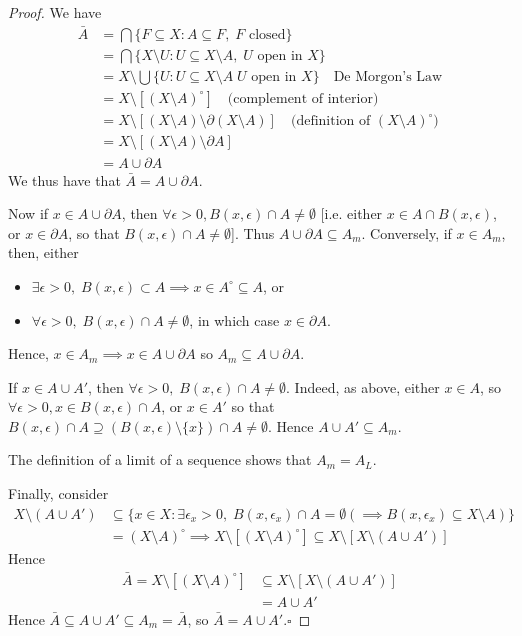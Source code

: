 \documentclass[11pt, oneside]{book}
\theoremstyle{break}
\newtheorem*{proof}{Proof}
\newcommand{\qed}{\hfill\ensuremath{\square}}	%
\begin{document}
\begin{proof}
	We have
	\begin{align*}
		\bar{A} &= \bigcap \{F \subseteq X : A \subseteq F, \; F \text{ closed}\} \\
			&= \bigcap \{X \setminus U : U \subseteq X \setminus A, \; U \text{ open in } X \}\\
			&= X \setminus \bigcup \{U : U \subseteq X \setminus A \; U \text{ open in } X \} \quad \text{De Morgon's Law} \\
			&= X \setminus [(X \setminus A)^\circ] \quad \text{(complement of interior)} \\
			&= X \setminus [(X \setminus A) \setminus \partial (X \setminus A)] \quad \text{(definition of $(X \setminus A)^\circ$)} \\
			&= X \setminus [(X \setminus A) \setminus \partial A] \\
			&= A \cup \partial A
	\end{align*}
	We thus have that $\bar{A} = A \cup \partial A$.

	Now if $x \in A \cup \partial A$, then $\forall \epsilon > 0, B(x, \epsilon) \cap A \neq \emptyset$ [i.e. either $x \in A \cap B(x, \epsilon)$, or $x \in \partial A$, so that $B(x, \epsilon) \cap A \neq \emptyset$]. Thus $A \cup \partial A \subseteq A_m$. Conversely, if $x \in A_m$, then, either
	\begin{itemize}
		\item $\exists \epsilon > 0, \; B(x, \epsilon) \subset A \implies x \in A^\circ \subseteq A$, or
		\item $\forall \epsilon > 0, \; B(x, \epsilon) \cap A \neq \emptyset$, in which case $x \in \partial A$.
	\end{itemize}
	Hence, $x \in A_m \implies x \in A \cup \partial A$ so $A_m \subseteq A \cup \partial A$.

	If $x \in A \cup A'$, then $\forall \epsilon > 0, \; B(x, \epsilon) \cap A \neq \emptyset$. Indeed, as above, either $x \in A$, so $\forall \epsilon > 0, x \in B(x, \epsilon) \cap A$, or $x \in A'$ so that $B(x, \epsilon) \cap A \supseteq (B(x, \epsilon) \setminus \{x\}) \cap A \neq \emptyset$. Hence $A \cup A' \subseteq A_m$.

	The definition of a limit of a sequence shows that $A_m = A_L$.

	Finally, consider
	\begin{align*}
		X \setminus (A \cup A') &\subseteq \{x \in X : \exists \epsilon_x > 0, \; B(x, \epsilon_x) \cap A = \emptyset (\implies B(x, \epsilon_x) \subseteq X \setminus A) \} \\
			&= (X \setminus A)^\circ \implies X \setminus [(X \setminus A)^\circ] \subseteq X \setminus [X \setminus (A \cup A')]
	\end{align*}
	Hence
	\begin{align*}
		\bar{A} = X \setminus [(X \setminus A)^\circ] &\subseteq X \setminus [X \setminus (A \cup A')] \\
			&= A \cup A'
	\end{align*}
	Hence $\bar{A} \subseteq A \cup A' \subseteq A_m = \bar{A}$, so $\bar{A} = A \cup A'$.\qed
\end{proof}
\end{document}
